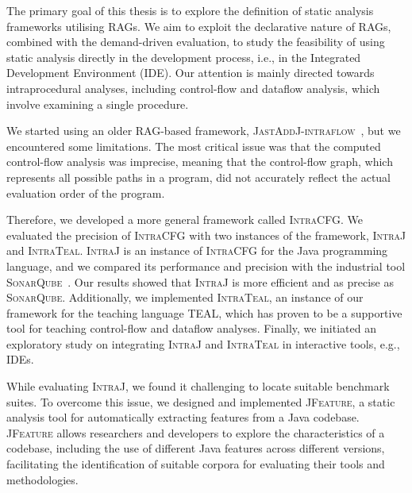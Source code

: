 The primary goal of this thesis is to explore the definition of static analysis 
frameworks utilising RAGs.
We aim to exploit the declarative nature of RAGs, 
combined with the demand-driven evaluation, to study the feasibility of using static 
analysis directly in the development process, i.e., in the Integrated Development Environment (IDE).
Our attention is mainly directed towards intraprocedural analyses, 
including control-flow and dataflow analysis, which involve examining a single procedure.

We started using an older RAG-based framework, \textsc{JastAddJ-intraflow}~\cite{10.1016/j.scico.2012.02.002},
but we encountered some limitations. The most critical issue was that the computed 
control-flow analysis was imprecise, meaning that the 
control-flow graph, which represents all possible paths in a program, did not 
accurately reflect the actual evaluation order of the program.

Therefore, we developed a more general framework called \textsc{IntraCFG}.
We evaluated the precision of \textsc{IntraCFG} with two instances of the framework, 
\textsc{IntraJ} and \textsc{IntraTeal}. 
\textsc{IntraJ} is an instance of \textsc{IntraCFG} for the Java programming language,
and we compared its performance and precision with the industrial tool \textsc{SonarQube}~\cite{sonarqube}. Our results 
showed that \textsc{IntraJ} is more efficient and as precise as \textsc{SonarQube}. 
Additionally, we implemented \textsc{IntraTeal}, an instance of our framework for the teaching 
language TEAL, which has proven to be a supportive tool for teaching control-flow and 
dataflow analyses. Finally, we initiated an exploratory study on integrating
\textsc{IntraJ} and \textsc{IntraTeal} in interactive tools, e.g., IDEs.

While evaluating \textsc{IntraJ}, we found it challenging to locate suitable 
benchmark suites. To overcome this issue, we designed and implemented \textsc{JFeature}, 
a static analysis tool for automatically extracting features from a Java codebase.
\textsc{JFeature} allows researchers and developers to explore the characteristics of a 
codebase, including the use of different Java features across different 
versions, facilitating the identification of suitable corpora for evaluating
their tools and methodologies.


